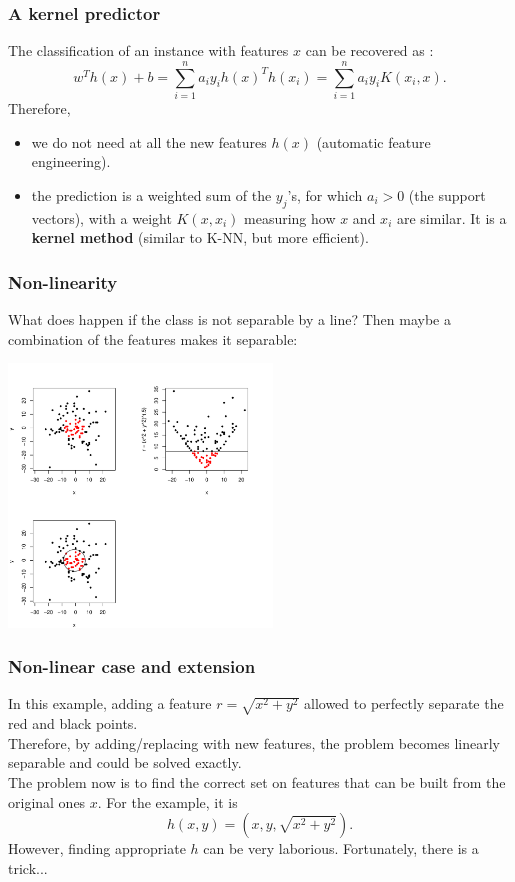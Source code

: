 \begin{frame}
\frametitle{A kernel predictor}
The classification of an instance with features $x$ can be recovered as :
$$
w^Th(x) + b = \sum_{i=1}^n a_i y_i h(x)^Th(x_i) = \sum_{i=1}^n a_i y_i K(x_i,x). 
$$
Therefore, 
\begin{itemize}
\item we do not need at all the new features $h(x)$ (automatic feature engineering).
\item the prediction is a weighted sum of the $y_j$'s, for which $a_i>0$ (the support vectors), with a weight $K(x,x_i)$ measuring how $x$ and $x_i$ are similar. It is a {\bf kernel method} (similar to K-NN, but more efficient).
\end{itemize}
\end{frame}
\begin{frame}
\frametitle{Non-linearity}
What does happen if the class is not separable by a line? Then maybe a combination of the features makes it separable:
\vspace{-0.5cm}
\begin{center}
\includegraphics[width=7cm]{../../Graphs/svm_quad.png} 
\end{center}
\end{frame}
\begin{frame}
\frametitle{Non-linear case and extension}
In this example, adding a feature $r = \sqrt{x^2+y^2}$ allowed to perfectly separate the red and black points. \\
\vspace{0.3cm}
Therefore, by adding/replacing with new features, the problem becomes linearly separable and could be solved exactly. \\
\vspace{0.3cm}
The problem now is to find the correct set on features that can be built from the original ones $x$. For the example, it is
$$
h(x,y) = \left(x, y, \sqrt{x^2+y^2}\right).
$$
However, finding appropriate $h$ can be very laborious. Fortunately, there is a trick...
\end{frame}

